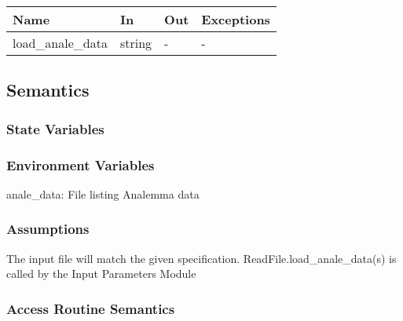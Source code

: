 \documentclass[12pt, titlepage]{article}
\begin{document}
\begin{center}
\begin{tabular}{p{3cm} p{3cm} p{3cm} p{2cm}}
\hline
\textbf{Name} & \textbf{In} & \textbf{Out} & \textbf{Exceptions} \\
\hline 
load\_anale\_data & string & - & -\\


\hline
\end{tabular}
\end{center}


\subsection{Semantics}

\subsubsection{State Variables}



\subsubsection{Environment Variables}

anale\_data: File listing Analemma data


\subsubsection{Assumptions}
The input file will match the given specification.
ReadFile.load\_anale\_data(s) is called by the Input Parameters Module

\subsubsection{ Access Routine Semantics}
\end{document}
